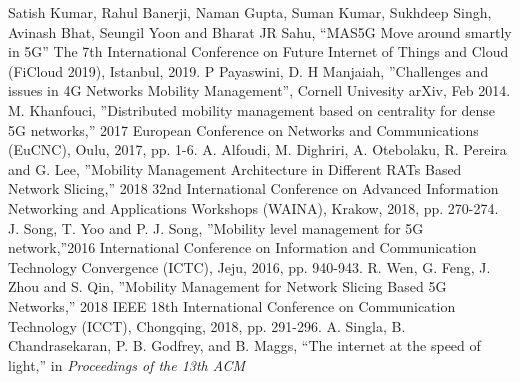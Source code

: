 \begin{multicols}{2}
{{{{{{{%


\begin{thebibliography}{99}
 Satish Kumar, Rahul Banerji, Naman Gupta, Suman Kumar, Sukhdeep Singh, Avinash Bhat, Seungil Yoon and Bharat JR Sahu, “MAS5G Move around smartly in 5G” The 7th International Conference on Future Internet of Things and Cloud (FiCloud 2019), Istanbul, 2019.
 P Payaswini, D. H Manjaiah, ”Challenges and issues in 4G Networks Mobility Management”, Cornell Univesity arXiv, Feb 2014.
 M. Khanfouci, ”Distributed mobility management based on centrality for dense 5G networks,” 2017 European Conference on Networks and Communications (EuCNC), Oulu, 2017, pp. 1-6.
 A. Alfoudi, M. Dighriri, A. Otebolaku, R. Pereira and G. Lee, ”Mobility Management Architecture in Different RATs Based Network Slicing,” 2018 32nd International Conference on Advanced Information Networking and Applications Workshops (WAINA), Krakow, 2018, pp. 270-274.
 J. Song, T. Yoo and P. J. Song, ”Mobility level management for 5G network,”2016 International Conference on Information and Communication Technology Convergence (ICTC), Jeju, 2016, pp. 940-943.
 R. Wen, G. Feng, J. Zhou and S. Qin, ”Mobility Management for Network Slicing Based 5G Networks,” 2018 IEEE 18th International Conference on Communication Technology (ICCT), Chongqing, 2018, pp. 291-296.
 A. Singla, B. Chandrasekaran, P. B. Godfrey, and B. Maggs, “The internet at the speed of light,” in \textit{Proceedings of the 13th ACM}


\end{thebibliography}}}}}}}}
\end{multicols}
